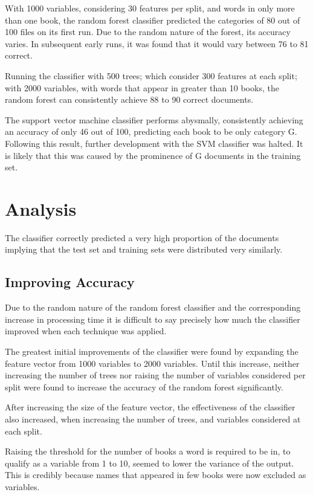 \documentclass[11pt]{article}
\begin{document}
With 1000 variables, considering 30 features per split, and words in only more
than one book, the random forest classifier predicted the categories of 80 out
of 100 files on its first run. Due to the random nature of the forest, its
accuracy varies. In subsequent early runs, it was found that it would vary
between 76 to 81 correct.

Running the classifier with 500 trees; which consider 300 features at each
split; with 2000 variables, with words that appear in greater than 10 books, the
random forest can consistently achieve 88 to 90 correct documents.

The support vector machine classifier performs abysmally, consistently achieving
an accuracy of only 46 out of 100, predicting each book to be only category G.
Following this result, further development with the SVM classifier was halted.
It is likely that this was caused by the prominence of G documents in the
training set.

\section{Analysis}

The classifier correctly predicted a very high proportion of the documents
implying that the test set and training sets were distributed very similarly.

\subsection{Improving Accuracy}

Due to the random nature of the random forest classifier and the corresponding
increase in processing time it is difficult to say precisely how much the
classifier improved when each technique was applied.

The greatest initial improvements of the classifier were found by expanding the
feature vector from 1000 variables to 2000 variables. Until this increase,
neither increasing the number of trees nor raising the number of variables
considered per split were found to increase the accuracy of the random forest
significantly. 

After increasing the size of the feature vector, the effectiveness of the
classifier also increased, when increasing the number of trees, and variables
considered at each split.

Raising the threshold for the number of books a word is required to be in, to
qualify as a variable from 1 to 10, seemed to lower the variance of the output.
This is credibly because names that appeared in few books were now excluded as
variables.
\end{document}
